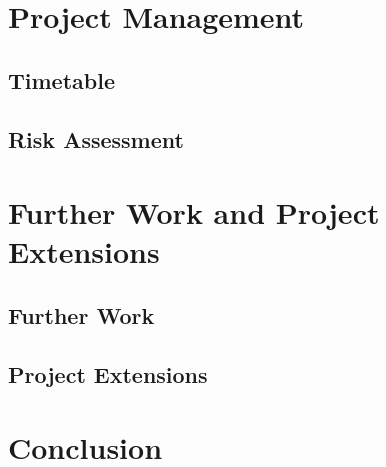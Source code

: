 \documentclass[12pt,a4paper]{article}
\begin{document}
    \section{Project Management}
    \label{sec:project_management}
    
        \subsection{Timetable}
        \label{sub:timetable}
        
        
        \subsection{Risk Assessment}
        \label{sub:risk_assessment}
        
        
    \section{Further Work and Project Extensions}
    \label{sec:further_work_project_extensions}
    
        \subsection{Further Work}
        \label{sub:further_work}
        
        
        \subsection{Project Extensions}
        \label{sub:project_extensions}
        
        
    \section{Conclusion}
    \label{sec:conclusion}
    
\end{document}
